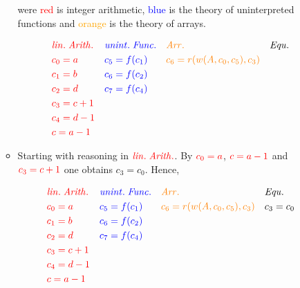 \documentclass[11pt,a4paper]{article}
\begin{document}
\begin{enumerate}
\begin{itemize}
were \textcolor{red}{red} is integer arithmetic, \textcolor{blue}{blue} is the theory of uninterpreted functions and \textcolor{orange}{orange} is the theory of arrays.

\begin{align*}
& \textcolor{red}{ \mathit{lin. \; Arith.} }  && \textcolor{blue}{ \mathit{unint. \; Func.}} && \textcolor{orange}{ \mathit{Arr.}} && \mathit{Equ.}  &\\
& \textcolor{red}{c_0 = a }  && \textcolor{blue}{ c_5 = f(c_1)  } && \textcolor{orange}{ c_6 = r(w(A, c_0, c_5), c_3) } &&  &\\
& \textcolor{red}{c_1 = b }  && \textcolor{blue}{ c_6 = f(c_2) } && \textcolor{orange}{ } &&  &\\
& \textcolor{red}{c_2 = d }  && \textcolor{blue}{ c_7 = f(c_4) } && \textcolor{orange}{ } &&  &\\
& \textcolor{red}{c_3 = c +1  }  && \textcolor{blue}{ } && \textcolor{orange}{ } &&  &\\
& \textcolor{red}{c_4 = d-1 }  && \textcolor{blue}{ } && \textcolor{orange}{ } &&  &\\
& \textcolor{red}{ c = a - 1}  && \textcolor{blue}{ } && \textcolor{orange}{ } &&  &\\
\end{align*}

\item Starting with reasoning in $\textcolor{red}{ \mathit{lin. \; Arith.} } $. By $\textcolor{red}{c_0 = a}$, $\textcolor{red}{c = a-1}$ and $\textcolor{red}{c_3 = c +1 }$ one obtains $c_3 = c_0$. Hence, 

\begin{align*}
& \textcolor{red}{ \mathit{lin. \; Arith.} }  && \textcolor{blue}{ \mathit{unint. \; Func.}} && \textcolor{orange}{ \mathit{Arr.}} && \mathit{Equ.}  &\\
& \textcolor{red}{c_0 = a }  && \textcolor{blue}{ c_5 = f(c_1)  } && \textcolor{orange}{ c_6 = r(w(A, c_0, c_5), c_3) } && c_3 = c_0 &\\
& \textcolor{red}{c_1 = b }  && \textcolor{blue}{ c_6 = f(c_2) } && \textcolor{orange}{ } &&  &\\
& \textcolor{red}{c_2 = d }  && \textcolor{blue}{ c_7 = f(c_4) } && \textcolor{orange}{ } &&  &\\
& \textcolor{red}{c_3 = c +1  }  && \textcolor{blue}{ } && \textcolor{orange}{ } &&  &\\
& \textcolor{red}{c_4 = d-1 }  && \textcolor{blue}{ } && \textcolor{orange}{ } &&  &\\
& \textcolor{red}{ c = a - 1}  && \textcolor{blue}{ } && \textcolor{orange}{ } &&  &\\
\end{align*}


\end{itemize}
\end{enumerate}
\end{document}
